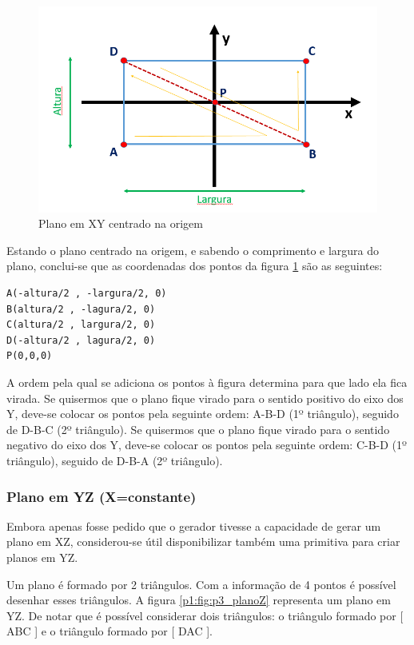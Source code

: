 \begin{figure}[htpb]
	\centering
	\includegraphics[scale=0.5]{imagens/p3_planoY.png}
	\caption{Plano em XY centrado na origem}
	\label{p1:fig:p3_planoY}
\end{figure}

Estando o plano centrado na origem, e sabendo o comprimento e largura do plano, conclui-se que as coordenadas dos pontos da figura \ref{p1:fig:p3_planoY} são as seguintes:

\begin{Verbatim}
A(-altura/2 , -largura/2, 0)
B(altura/2 , -lagura/2, 0)
C(altura/2 , largura/2, 0)
D(-altura/2 , lagura/2, 0)
P(0,0,0)
\end{Verbatim}



A ordem pela qual se adiciona os pontos à figura determina para que lado ela fica virada. Se quisermos que o plano fique virado para o sentido positivo do eixo dos Y, deve-se colocar os pontos pela seguinte ordem: A-B-D (1º triângulo), seguido de D-B-C (2º triângulo). Se quisermos que o plano fique virado para o sentido negativo do eixo dos Y, deve-se colocar os pontos pela seguinte ordem: C-B-D (1º triângulo), seguido de D-B-A (2º triângulo).


\subsubsection{Plano em YZ (X=constante)}

Embora apenas fosse pedido que o gerador tivesse a capacidade de gerar um plano em XZ, considerou-se útil disponibilizar também uma primitiva para criar planos em YZ.

Um plano é formado por 2 triângulos. Com a informação de 4 pontos é possível desenhar esses triângulos. A figura \ref{p1:fig:p3_planoZ} representa um plano em YZ. De notar que é possível considerar dois triângulos: o triângulo formado por [ ABC ] e o triângulo formado por [ DAC ].

